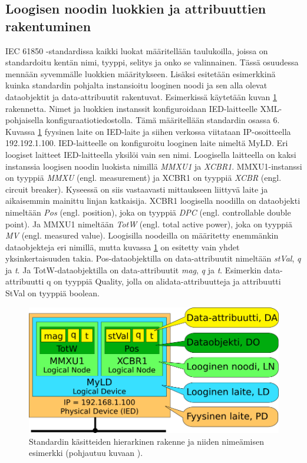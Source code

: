 \subsection{Loogisen noodin luokkien ja attribuuttien rakentuminen}
\label{ch:luokkien-rakentuminen-instanseista}
IEC 61850 -standardissa kaikki luokat määritellään taulukoilla, joissa on standardoitu kentän nimi, tyyppi, selitys ja onko se valinnainen. Tässä osuudessa mennään syvemmälle luokkien määritykseen. Lisäksi esitetään esimerkkinä kuinka standardin pohjalta instansioitu looginen noodi ja sen alla olevat dataobjektit ja data-attribuutit rakentuvat. Esimerkissä käytetään kuvan \ref{fig:iec61850-data-modeling} rakennetta. Nimet ja luokkien instanssit konfiguroidaan IED-laitteelle XML-pohjaisella konfiguraatiotiedostolla. Tämä määritellään standardin osassa 6. Kuvassa \ref{fig:iec61850-data-modeling} fyysinen laite on IED-laite ja siihen verkossa viitataan IP-osoitteella 192.192.1.100. IED-laitteelle on konfiguroitu looginen laite nimeltä MyLD. Eri loogiset laitteet IED-laitteella yksilöi vain sen nimi. Loogisella laitteella on kaksi instanssia loogisen noodin luokista nimillä \emph{MMXU1} ja \emph{XCBR1}. MMXU1-instanssi on tyyppiä \emph{MMXU} (engl. measurement) \mbox{\cite[s.~57--58]{IEC61850-7-4}} ja XCBR1 on tyyppiä \emph{XCBR} (engl. circuit breaker). Kyseessä on siis vastaavasti mittaukseen liittyvä laite ja aikaisemmin mainittu linjan katkaisija. XCBR1 loogisella noodilla on dataobjekti nimeltään \emph{Pos} (engl. position), joka on tyyppiä \emph{DPC} (engl. controllable double point). Ja MMXU1 nimeltään \emph{TotW} (engl. total active power), joka on tyyppiä \emph{MV} (engl. measured value). Loogisilla noodeilla on määritetty enemmänkin dataobjekteja eri nimillä, mutta kuvassa \ref{fig:iec61850-data-modeling} on esitetty vain yhdet yksinkertaisuuden takia. Pos-dataobjektilla on data-attribuutit nimeltään \emph{stVal}, \emph{q} ja \emph{t}. Ja TotW-dataobjektilla on data-attribuutit \emph{mag}, \emph{q} ja \emph{t}. Esimerkin data-attribuutti q on tyyppiä Quality, jolla on alidata-attribuutteja ja attribuutti StVal on tyyppiä boolean. \mbox{\cite{IEC61850-7-3, IEC61850-7-4}}

\begin{figure}[ht!]
	\includegraphics[width=1\textwidth]{pictures/iec61850-data-modeling.png}
	\caption{Standardin käsitteiden hierarkinen rakenne ja niiden nimeämisen esimerkki (pohjautuu kuvaan \mbox{\cite[s.~24]{IEC61850-1}}).}
	\label{fig:iec61850-data-modeling}
\end{figure}

